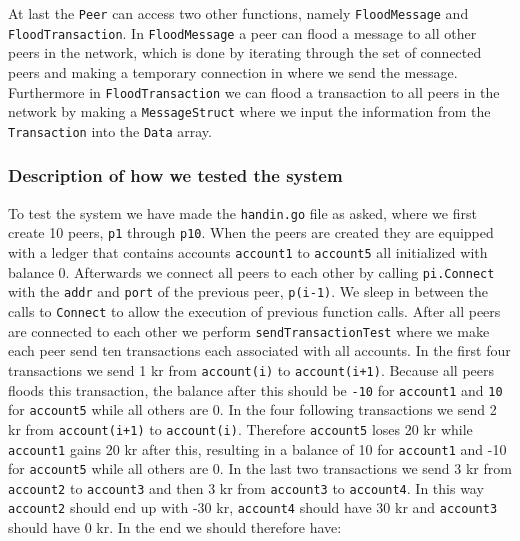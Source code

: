 \documentclass[
  paper=a4,
  ,captions=tableheading
]{scrartcl}
\newcommand{\passthrough}[1]{#1}
\begin{document}
At last the \passthrough{\lstinline!Peer!} can access two other
functions, namely \passthrough{\lstinline!FloodMessage!} and
\passthrough{\lstinline!FloodTransaction!}. In
\passthrough{\lstinline!FloodMessage!} a peer can flood a message to all
other peers in the network, which is done by iterating through the set
of connected peers and making a temporary connection in where we send
the message. Furthermore in \passthrough{\lstinline!FloodTransaction!}
we can flood a transaction to all peers in the network by making a
\passthrough{\lstinline!MessageStruct!} where we input the information
from the \passthrough{\lstinline!Transaction!} into the
\passthrough{\lstinline!Data!} array.

\hypertarget{description-of-how-we-tested-the-system}{%
\subsubsection{\texorpdfstring{\textbf{Description of how we tested the
system}}{Description of how we tested the system}}\label{description-of-how-we-tested-the-system}}

To test the system we have made the \passthrough{\lstinline!handin.go!}
file as asked, where we first create 10 peers,
\passthrough{\lstinline!p1!} through \passthrough{\lstinline!p10!}. When
the peers are created they are equipped with a ledger that contains
accounts \passthrough{\lstinline!account1!} to
\passthrough{\lstinline!account5!} all initialized with balance 0.
Afterwards we connect all peers to each other by calling
\passthrough{\lstinline!pi.Connect!} with the
\passthrough{\lstinline!addr!} and \passthrough{\lstinline!port!} of the
previous peer, \passthrough{\lstinline!p(i-1)!}. We sleep in between the
calls to \passthrough{\lstinline!Connect!} to allow the execution of
previous function calls. After all peers are connected to each other we
perform \passthrough{\lstinline!sendTransactionTest!} where we make each
peer send ten transactions each associated with all accounts. In the
first four transactions we send 1 kr from
\passthrough{\lstinline!account(i)!} to
\passthrough{\lstinline!account(i+1)!}. Because all peers floods this
transaction, the balance after this should be
\passthrough{\lstinline!-10!} for \passthrough{\lstinline!account1!} and
\passthrough{\lstinline!10!} for \passthrough{\lstinline!account5!}
while all others are 0. In the four following transactions we send 2 kr
from \passthrough{\lstinline!account(i+1)!} to
\passthrough{\lstinline!account(i)!}. Therefore
\passthrough{\lstinline!account5!} loses 20 kr while
\passthrough{\lstinline!account1!} gains 20 kr after this, resulting in
a balance of 10 for \passthrough{\lstinline!account1!} and -10 for
\passthrough{\lstinline!account5!} while all others are 0. In the last
two transactions we send 3 kr from \passthrough{\lstinline!account2!} to
\passthrough{\lstinline!account3!} and then 3 kr from
\passthrough{\lstinline!account3!} to
\passthrough{\lstinline!account4!}. In this way
\passthrough{\lstinline!account2!} should end up with -30 kr,
\passthrough{\lstinline!account4!} should have 30 kr and
\passthrough{\lstinline!account3!} should have 0 kr. In the end we
should therefore have:
\end{document}
